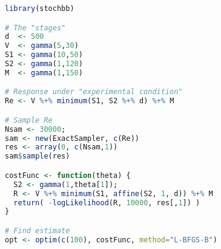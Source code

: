 \begin{lstlisting}[language=R, basicstyle=\footnotesize]
library(stochbb)

# The "stages"
d  <- 500
V  <- gamma(5,30)
S1 <- gamma(10,50)
S2 <- gamma(1,120)
M  <- gamma(1,150) 

# Response under "experimental condition"
Re <- V %+% minimum(S1, S2 %+% d) %+% M

# Sample Re
Nsam <- 30000;
sam <- new(ExactSampler, c(Re))
res <- array(0, c(Nsam,1))
sam$sample(res)

costFunc <- function(theta) {
  S2 <- gamma(1,theta[1]);
  R <- V %+% minimum(S1, affine(S2, 1, d)) %+% M
  return( -logLikelihood(R, 10000, res[,1]) )
}

# Find estimate
opt <- optim(c(100), costFunc, method="L-BFGS-B")
\end{lstlisting}